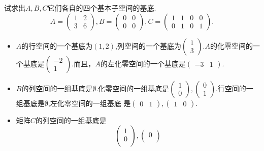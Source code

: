 ﻿\documentclass{book} \usepackage{exsheets} \usepackage{xeCJK}
\begin{document}
\begin{question}
  试求出$A,B,C$它们各自的四个基本子空间的基底.
$$
A=
\begin{pmatrix}
  1&2\\
  3&6
\end{pmatrix},B=
\begin{pmatrix}
  0&0\\
  0&0
\end{pmatrix},C=
\begin{pmatrix}
  1&1&0&0\\
  0&1&0&1
\end{pmatrix}.
$$
\end{question}
\begin{solution}
  \begin{itemize}
  \item $A$的行空间的一个基底为$(1,2)$,列空间的一个基底为$
    \begin{pmatrix}
      1\\
      3
    \end{pmatrix}
    $.$A$的化零空间的一个基底是$
    \begin{pmatrix}
      -2\\
      1
    \end{pmatrix}.  $而且，$A$的左化零空间的一个基底是$
    \begin{pmatrix}
      -3&1
    \end{pmatrix}.  $
  \item $B$的列空间的一组基底是$\emptyset$.化零空间的一组基底是$
    \begin{pmatrix}
      1\\
      0
    \end{pmatrix},
    \begin{pmatrix}
      0\\
      1
    \end{pmatrix}.  $行空间的一组基底是$\emptyset$,左化零空间的一组基底
    是$
    \begin{pmatrix}
      0&1
    \end{pmatrix},
    \begin{pmatrix}
      1&0
    \end{pmatrix}.  $
  \item 矩阵$C$的列空间的一组基底是
$$
\begin{pmatrix}
  1\\
  0\\
\end{pmatrix},
\begin{pmatrix}
  0\\

\end{pmatrix}$$
\end{itemize}
\end{solution}
\end{document}
